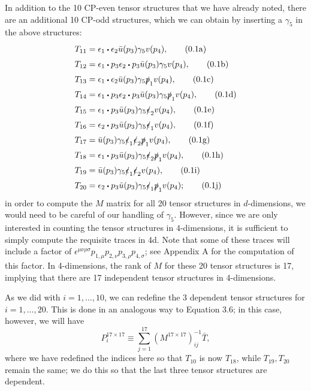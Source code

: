 \documentclass[12pt]{article}
\numberwithin{equation}{section}
\numberwithin{figure}{section}
\numberwithin{table}{section}
\newcommand{\numberthisa}{\addtocounter{equation}{1}\tag{\theequation a}}
\newcommand{\numberthisb}{\addtocounter{equation}{0}\tag{\theequation b}}
\newcommand{\numberthisc}{\addtocounter{equation}{0}\tag{\theequation c}}
\newcommand{\numberthisd}{\addtocounter{equation}{0}\tag{\theequation d}}
\newcommand{\numberthise}{\addtocounter{equation}{0}\tag{\theequation e}}
\newcommand{\numberthisf}{\addtocounter{equation}{0}\tag{\theequation f}}
\newcommand{\numberthisg}{\addtocounter{equation}{0}\tag{\theequation g}}
\newcommand{\numberthish}{\addtocounter{equation}{0}\tag{\theequation h}}
\newcommand{\numberthisi}{\addtocounter{equation}{0}\tag{\theequation i}}
\newcommand{\numberthisj}{\addtocounter{equation}{0}\tag{\theequation j}}
\renewcommand{\theequation}{\arabic{section}.\arabic{equation}}
\newcommand{\ndot}{\mathrel{\raisebox{-2.3pt}{$ \!  \mathlarger{\mathlarger{\mathlarger{\mathlarger{\cdot}}}} \! $}}}
\begin{document}
	In addition to the 10 CP-even tensor structures that we have already noted, there are an additional 10 CP-odd structures, which we can obtain by inserting a \(\gamma_5\) in the above structures:  
	\begin{align*}
	T_{11} & =\epsilon_1\ndot\epsilon_2\bar{u}(p_3)\gamma_5v(p_4), \numberthisa\\
	T_{12} & =\epsilon_1\ndot p_3\epsilon_2\ndot p_3\bar{u}(p_3)\gamma_5v(p_4), \numberthisb\\
	T_{13} & =\epsilon_1\ndot\epsilon_2\bar{u}(p_3)\gamma_5\slashed{p}_1v(p_4), \numberthisc\\
	T_{14} & =\epsilon_1\ndot p_3\epsilon_2\ndot p_3\bar{u}(p_3)\gamma_5\slashed{p}_1v(p_4), \numberthisd\\
	T_{15} & =\epsilon_1\ndot p_3\bar{u}(p_3)\gamma_5\slashed{\epsilon}_2v(p_4), \numberthise\\
	T_{16} & =\epsilon_2\ndot p_3\bar{u}(p_3)\gamma_5\slashed{\epsilon}_1v(p_4), \numberthisf\\
	T_{17} & =\bar{u}(p_3)\gamma_5\slashed{\epsilon}_1\slashed{\epsilon}_2\slashed{p}_1v(p_4), \numberthisg\\
	T_{18} & =\epsilon_1\ndot p_3\bar{u}(p_3)\gamma_5\slashed{\epsilon}_2\slashed{p}_1v(p_4), \numberthish\\
	T_{19} & =\bar{u}(p_3)\gamma_5\slashed{\epsilon}_1\slashed{\epsilon}_2v(p_4), \numberthisi\\
	T_{20} & =\epsilon_2\ndot p_3\bar{u}(p_3)\gamma_5\slashed{\epsilon}_1\slashed{p}_1v(p_4); \numberthisj
	\end{align*}
	in order to compute the \(M\) matrix for all 20 tensor structures in \(d\)-dimensions, we would need to be careful of our handling of \(\gamma_5\). However, since we are only interested in counting the tensor structures in \(4\)-dimensions, it is sufficient to simply compute the requisite traces in 4d. Note that some of these traces will include a factor of \(\epsilon^{\mu\nu\rho\sigma}p_{1,\mu}p_{2,\nu}p_{3,\rho}p_{4,\sigma}\); see Appendix A for the computation of this factor. In 4-dimensions, the rank of \(M\) for these 20 tensor structures is 17, implying that there are 17 independent tensor structures in 4-dimensions.
	
	As we did with \(i=1,\dots,10\), we can redefine the 3 dependent tensor structures for \(i=1,\dots,20\). This is done in an analogous way to Equation 3.6; in this case, however, we will have  
	\begin{equation}
	P_i^{17\times 17}\equiv\sum_{j=1}^{17}(M^{17\times 17})_{ij}^{-1}\bar{T},
	\end{equation}
	where we have redefined the indices here so that \(T_{10}\) is now \(T_{18}\), while \(T_{19},T_{20}\) remain the same; we do this so that the last three tensor structures are dependent.
	
\end{document}
